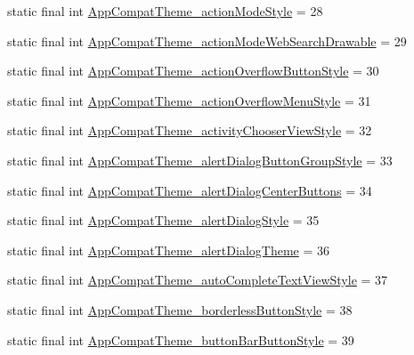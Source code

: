 \begin{DoxyCompactItemize}
\item 
static final int \mbox{\hyperlink{classandroid_1_1support_1_1design_1_1R_1_1styleable_aae6a4f503401f7efc9c94e43b01271a7}{App\+Compat\+Theme\+\_\+action\+Mode\+Style}} = 28
\item 
static final int \mbox{\hyperlink{classandroid_1_1support_1_1design_1_1R_1_1styleable_add9905765c33ef54aeaaf390ae2195d1}{App\+Compat\+Theme\+\_\+action\+Mode\+Web\+Search\+Drawable}} = 29
\item 
static final int \mbox{\hyperlink{classandroid_1_1support_1_1design_1_1R_1_1styleable_aa3f2417348f8b9486dcf6c577373fd21}{App\+Compat\+Theme\+\_\+action\+Overflow\+Button\+Style}} = 30
\item 
static final int \mbox{\hyperlink{classandroid_1_1support_1_1design_1_1R_1_1styleable_a2e63c132db3b20cbc996a971b5deda6a}{App\+Compat\+Theme\+\_\+action\+Overflow\+Menu\+Style}} = 31
\item 
static final int \mbox{\hyperlink{classandroid_1_1support_1_1design_1_1R_1_1styleable_a13b436eb02e31bcf51b5b3971354fd0e}{App\+Compat\+Theme\+\_\+activity\+Chooser\+View\+Style}} = 32
\item 
static final int \mbox{\hyperlink{classandroid_1_1support_1_1design_1_1R_1_1styleable_a6dfecde95eb2fc3d2acf3a0a86c9d169}{App\+Compat\+Theme\+\_\+alert\+Dialog\+Button\+Group\+Style}} = 33
\item 
static final int \mbox{\hyperlink{classandroid_1_1support_1_1design_1_1R_1_1styleable_ac2f3909b5317e1b2a41c18178be52941}{App\+Compat\+Theme\+\_\+alert\+Dialog\+Center\+Buttons}} = 34
\item 
static final int \mbox{\hyperlink{classandroid_1_1support_1_1design_1_1R_1_1styleable_abad1f233fe2c6d34d702334fc703bd92}{App\+Compat\+Theme\+\_\+alert\+Dialog\+Style}} = 35
\item 
static final int \mbox{\hyperlink{classandroid_1_1support_1_1design_1_1R_1_1styleable_a83269aab8e223466c81841ff2ce5304f}{App\+Compat\+Theme\+\_\+alert\+Dialog\+Theme}} = 36
\item 
static final int \mbox{\hyperlink{classandroid_1_1support_1_1design_1_1R_1_1styleable_af8989d3616f2d90b9093e72b325da129}{App\+Compat\+Theme\+\_\+auto\+Complete\+Text\+View\+Style}} = 37
\item 
static final int \mbox{\hyperlink{classandroid_1_1support_1_1design_1_1R_1_1styleable_a55cbb1dce6c77a69dc7cdbffde3c3109}{App\+Compat\+Theme\+\_\+borderless\+Button\+Style}} = 38
\item 
static final int \mbox{\hyperlink{classandroid_1_1support_1_1design_1_1R_1_1styleable_a3a8ca30886e2e70927639892678e86da}{App\+Compat\+Theme\+\_\+button\+Bar\+Button\+Style}} = 39

\end{DoxyCompactItemize}
